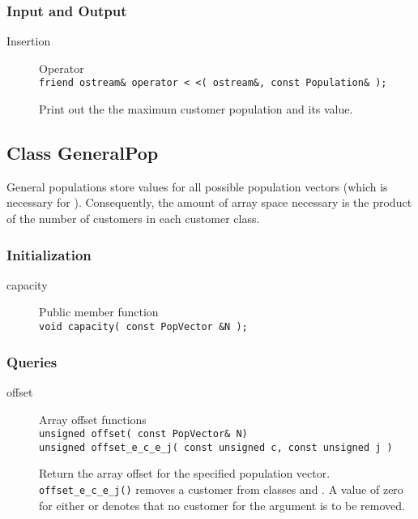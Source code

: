 \subsubsection{Input and Output}
\label{sec:population-io}
\begin{description}
\item[Insertion] \texonly{---} Operator\\
  \texttt{friend ostream\& operator < <( ostream\&, const Population\& );}

  Print out the the maximum customer population
   and its value.
\end{description}

\subsection{Class GeneralPop}
\label{sec:general-population}

General populations store values for all possible population vectors
(which is necessary for ).
Consequently, the amount of array space necessary is the product of
the number of customers in each customer class.  

\subsubsection{Initialization}
\begin{description}
\item[capacity] \texonly{---} Public member function\\
  \texttt{void capacity( const PopVector \&N );}
\end{description}

\subsubsection{Queries}

\begin{description}

\item[offset] \texonly{---} Array offset functions\\
  \texttt{unsigned offset( const PopVector\& N)}\\
  \texttt{unsigned offset\_e\_c\_e\_j( const unsigned c, const unsigned j )}

  Return the array offset for the specified population vector.
  \texttt{offset\_e\_c\_e\_j()} removes a customer from classes  and
  .  A value of zero for either  or  denotes that
  no customer for the argument is to be removed.

\end{description}


